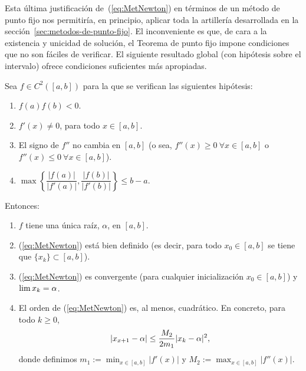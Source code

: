 Esta última justificación de~(\ref{eq:MetNewton}) en términos de un
método de punto fijo nos permitiría, en principio, aplicar toda la
artillería desarrollada en la
sección~\ref{sec:metodos-de-punto-fijo}. El inconveniente es que, de
cara a la existencia y unicidad de solución, el Teorema de punto fijo
impone condiciones que no son fáciles de verificar.  El siguiente
resultado global (con hipótesis sobre el intervalo) ofrece condiciones suficientes
más apropiadas.

\begin{theorem}
  Sea $f\in C^2([a,b])$ para la que se verifican las siguientes
  hipótesis:
  \begin{enumerate}[label=($N_{\arabic*}$)]
  \item $f(a)f(b)<0$.
    \label{item:Newton.H1}
  \item  $f'(x)\neq 0$, para todo $x \in [a,b]$.
    \label{item:Newton.H2}
  \item
    El signo de $f''$ no cambia en $[a,b]$ (o sea,
    $f''(x)\ge 0 \ \forall x\in [a,b]$ o $f''(x)\le 0 \ \forall x\in [a,b]$).
    \label{item:Newton.H3}
  \item
    $\max\left\{ \dfrac{|f(a)|}{|f'(a)|}, \dfrac{|f(b)|}{|f'(b)|}
    \right\} \le b-a.$
    \label{item:Newton.H4}
  \end{enumerate}
  Entonces:
  \begin{enumerate}
  \item $f$ tiene una única raíz, $\alpha$, en $[a,b]$.
  \item (\ref{eq:MetNewton}) está bien definido (es decir, para todo
    $x_0\in [a,b]$ se tiene que $\{x_k\} \subset [a,b]$).
  \item (\ref{eq:MetNewton}) es convergente (para cualquier
    inicialización $x_0\in [a,b]$) y $\lim x_k = \alpha$.
  \item El orden de (\ref{eq:MetNewton}) es, al menos, cuadrático. En
    concreto, para todo $k\ge 0$,
    \begin{equation}
      |x_{x+1} - \alpha| \le \frac {M_2}{2m_1} |x_k-\alpha|^2,
      \label{eq:Newton.orden.2}
    \end{equation}
    donde definimos $m_1:=\min_{x\in[a,b]} |f'(x)|$ y $M_2:=\max_{x\in[a,b]}|f''(x)|$.
  \end{enumerate}
  \label{thm:Newton.convergencia.global}
\end{theorem}

